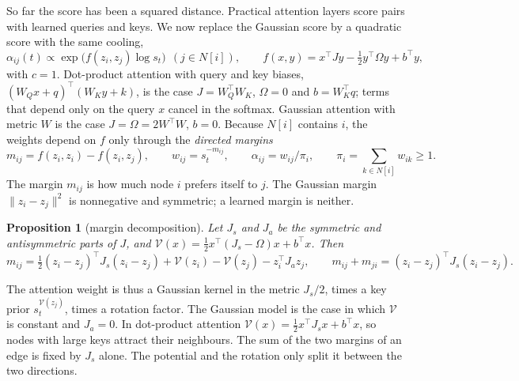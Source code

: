 \documentclass[10pt]{article}
\newtheorem{proposition}{Proposition}
\theoremstyle{definition}
\theoremstyle{remark}
\begin{document}
So far the score has been a squared distance. Practical attention layers score pairs with learned queries and keys. We now replace the
Gaussian score by a quadratic score with the same cooling,
\begin{equation}\label{eq:qk}
\alpha_{ij}(t)\propto\exp\big(f(z_i,z_j)\log s_t\big)\ \ (j\in N[i]),\qquad f(x,y)=x^\top Jy-\tfrac12y^\top\Omega y+b^\top y ,
\end{equation}
with $c=1$. Dot-product attention with query and key biases, $(W_Qx+q)^\top(W_Ky+k)$, is the case $J=W_Q^\top W_K$, $\Omega=0$ and
$b=W_K^\top q$; terms that depend only on the query $x$ cancel in the softmax. Gaussian attention with metric $W$ is the case $J=\Omega=2W^\top W$,
$b=0$. Because $N[i]$ contains $i$, the weights depend on $f$ only through the \emph{directed margins}
\[
m_{ij}=f(z_i,z_i)-f(z_i,z_j),\qquad w_{ij}=s_t^{-m_{ij}},\qquad \alpha_{ij}=w_{ij}/\pi_i,\qquad \pi_i={\textstyle\sum_{k\in N[i]}}w_{ik}\ge1 .
\]
The margin $m_{ij}$ is how much node $i$ prefers itself to $j$. The Gaussian margin $\|z_i-z_j\|^2$ is nonnegative and symmetric; a learned
margin is neither.

\begin{proposition}[margin decomposition]\label{prop:margin}
Let $J_s$ and $J_a$ be the symmetric and antisymmetric parts of $J$, and $\mathcal V(x)=\frac12x^\top(J_s-\Omega)x+b^\top x$. Then
\[
m_{ij}=\tfrac12(z_i-z_j)^\top J_s(z_i-z_j)+\mathcal V(z_i)-\mathcal V(z_j)-z_i^\top J_az_j,\qquad m_{ij}+m_{ji}=(z_i-z_j)^\top J_s(z_i-z_j).
\]
\end{proposition}

The attention weight is thus a Gaussian kernel in the metric $J_s/2$, times a key prior $s_t^{\mathcal V(z_j)}$, times a rotation factor. The
Gaussian model is the case in which $\mathcal V$ is constant and $J_a=0$. In dot-product attention $\mathcal V(x)=\frac12x^\top J_sx+b^\top x$, so nodes
with large keys attract their neighbours. The sum of the two margins of an edge is fixed by $J_s$ alone. The potential and the rotation only
split it between the two directions.
\end{document}
